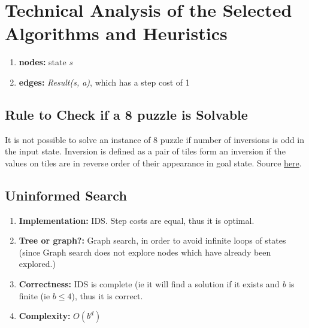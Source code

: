 \documentclass[runningheads]{llncs}
\begin{document}
\section{Technical Analysis of the Selected Algorithms and Heuristics}
\begin{enumerate}
    \item \textbf{nodes:} state \textit{s}
    \item \textbf{edges:} \textit{Result(s, a)}, which has a step cost of 1
\end{enumerate}

\subsection{Rule to Check if a 8 puzzle is Solvable}
It is not possible to solve an instance of 8 puzzle if number of inversions is odd in the input state. 
Inversion is defined as a pair of tiles form an inversion if the values on tiles are in reverse order of their appearance in goal state. Source \href{https://www.geeksforgeeks.org/check-instance-8-puzzle-solvable/}{here}.

\subsection{Uninformed Search}
\begin{enumerate}
    \item \textbf{Implementation:} IDS. Step costs are equal, thus it is optimal.
    \item \textbf{Tree or graph?:} Graph search, in order to avoid infinite loops of states (since Graph search does not explore nodes which have already been explored.)
    \item \textbf{Correctness:} IDS is complete (ie it will find a solution if it exists and \textit{b} is finite (ie \( b \leq 4 \)), thus it is correct.
    \item \textbf{Complexity:} \( O(b^d) \)
\end{enumerate}

\end{document}
